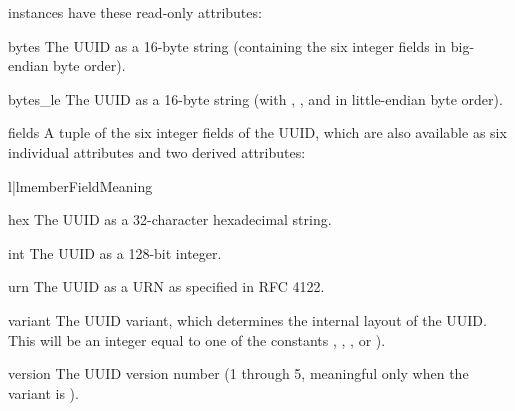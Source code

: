  instances have these read-only attributes:

\begin{memberdesc}{bytes}
The UUID as a 16-byte string (containing the six
integer fields in big-endian byte order).
\end{memberdesc}

\begin{memberdesc}{bytes_le}
The UUID as a 16-byte string (with , ,
and  in little-endian byte order).
\end{memberdesc}

\begin{memberdesc}{fields}
A tuple of the six integer fields of the UUID, which are also available
as six individual attributes and two derived attributes:

\begin{tableii}{l|l}{member}{Field}{Meaning}
\end{tableii}


\end{memberdesc}

\begin{memberdesc}{hex}
The UUID as a 32-character hexadecimal string.
\end{memberdesc}

\begin{memberdesc}{int}
The UUID as a 128-bit integer.
\end{memberdesc}

\begin{memberdesc}{urn}
The UUID as a URN as specified in RFC 4122.
\end{memberdesc}

\begin{memberdesc}{variant}
The UUID variant, which determines the internal layout of the UUID.
This will be an integer equal to one of the constants
,
, , or
).
\end{memberdesc}

\begin{memberdesc}{version}
The UUID version number (1 through 5, meaningful only
when the variant is ).
\end{memberdesc}

